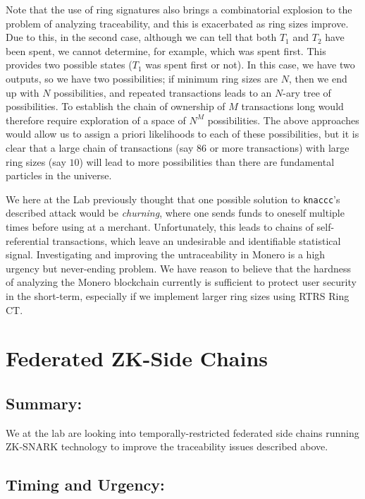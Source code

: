 \documentclass[12pt,english]{mrl}
\theoremstyle{definition}
\numberwithin{equation}{section}
\numberwithin{figure}{section}
\numberwithin{equation}{section}
\numberwithin{equation}{section}
\numberwithin{figure}{section}
\begin{document}
Note that the use of ring signatures also brings a combinatorial explosion to the problem of analyzing traceability, and this is exacerbated as ring sizes improve. Due to this, in the second case, although we can tell that both $T_1$ and $T_2$ have been spent, we cannot determine, for example, which was spent first. This provides two possible states ($T_1$ was spent first or not). In this case, we have two outputs, so we have two possibilities; if minimum ring sizes are $N$, then we end up with $N$ possibilities, and repeated transactions leads to an $N$-ary tree of possibilities. To establish the chain of ownership of $M$ transactions long would therefore require exploration of a space of $N^M$ possibilities. The above approaches would allow us to assign a priori likelihoods to each of these possibilities, but it is clear that a large chain of transactions (say $86$ or more transactions) with large ring sizes (say $10$) will lead to more possibilities than there are fundamental particles in the universe.

We here at the Lab previously thought that one possible solution to \texttt{knaccc}'s described attack would be \textit{churning}, where one sends funds to oneself multiple times before using at a merchant. Unfortunately, this leads to chains of self-referential transactions, which leave an undesirable and identifiable statistical signal.  Investigating and improving the untraceability in Monero is a high urgency but never-ending problem. We have reason to believe that the hardness of analyzing the Monero blockchain currently is sufficient to protect user security in the short-term, especially if we implement larger ring sizes using RTRS Ring CT.




\section{Federated ZK-Side Chains}


\subsection{Summary:} 

We at the lab are looking into temporally-restricted federated side chains running ZK-SNARK technology to improve the traceability issues described above. 

\subsection{Timing and Urgency:} 
\end{document}
